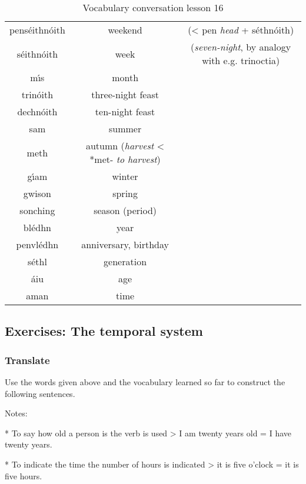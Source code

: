 \begin{table}[H]
\begin{tabular}{ccc}
  \midrule
  pens\'{e}ithn\'{o}ith & weekend & (< pen \textit{head} + s\'{e}thn\'{o}ith)\\
  s\'{e}ithn\'{o}ith & week & (\textit{seven-night}, by analogy with e.g. trinoctia)\\
  m\'{\i}s & month & \\
  \midrule
  trin\'{o}ith & three-night feast & \\
  dechn\'{o}ith & ten-night feast & \\
  \midrule
  sam & summer & \\
  meth & autumn (\textit{harvest} < *met- \textit{to harvest})\\
  g\'{\i}am & winter & \\
  gwison & spring & \\
  \midrule
  sonching & season (period) & \\
  bl\'{e}dhn & year & \\
  penvl\'{e}dhn & anniversary, birthday & \\
  \midrule
  s\'{e}thl & generation & \\
  \'{a}iu & age & \\
  aman & time & \\
  \bottomrule
\end{tabular}
\label{vocab_conversation_lesson16}
\caption{Vocabulary conversation lesson 16}
\end{table}

\subsection{Exercises: The temporal system}

\subsubsection{Translate}

Use the words given above and the vocabulary learned so far to construct the following sentences.

Notes: 

* To say how old a person is the verb  is used
> I am twenty years old = I have twenty years.

* To indicate the time the number of hours is indicated
> it is five o’clock = it is five hours.

